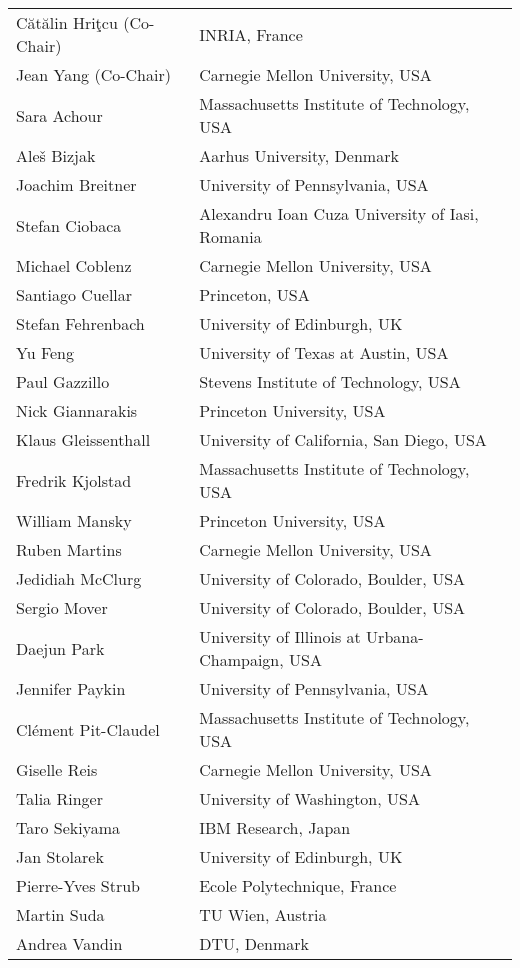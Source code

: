 \begin{tabular}{@{}p{\namewidth}l@{}}
Cătălin Hriţcu (Co-Chair)
  & INRIA, France \\
Jean Yang (Co-Chair)
  & Carnegie Mellon University, USA \\
Sara Achour
  & Massachusetts Institute of Technology, USA \\
Aleš Bizjak
  & Aarhus University, Denmark \\
Joachim Breitner
  & University of Pennsylvania, USA \\
Stefan Ciobaca
  & Alexandru Ioan Cuza University of Iasi, Romania \\
Michael Coblenz
  & Carnegie Mellon University, USA  \\
Santiago Cuellar
  & Princeton, USA \\
Stefan Fehrenbach
  & University of Edinburgh, UK \\
Yu Feng
  & University of Texas at Austin, USA \\
Paul Gazzillo
  & Stevens Institute of Technology, USA \\
Nick Giannarakis
  & Princeton University, USA \\
Klaus Gleissenthall
  & University of California, San Diego, USA \\
Fredrik Kjolstad
  & Massachusetts Institute of Technology, USA \\
William Mansky
  & Princeton University, USA \\
Ruben Martins
  & Carnegie Mellon University, USA \\
Jedidiah McClurg
  & University of Colorado, Boulder, USA \\
Sergio Mover
  & University of Colorado, Boulder, USA \\
Daejun Park
  & University of Illinois at Urbana-Champaign, USA \\
Jennifer Paykin
  & University of Pennsylvania, USA \\
Clément Pit-Claudel
  & Massachusetts Institute of Technology, USA \\
Giselle Reis
  & Carnegie Mellon University, USA \\
Talia Ringer
  & University of Washington, USA \\
Taro Sekiyama
  & IBM Research, Japan \\
Jan Stolarek
  & University of Edinburgh, UK  \\
Pierre-Yves Strub
  & Ecole Polytechnique, France \\
Martin Suda
  & TU Wien, Austria \\
Andrea Vandin
  & DTU, Denmark \\
\end{tabular}


\newpage
